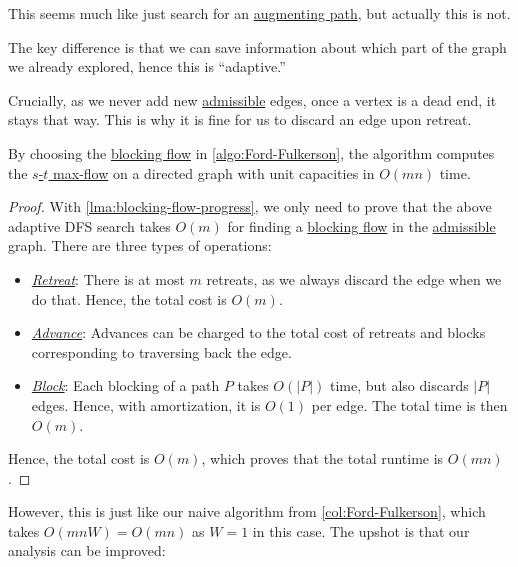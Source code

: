 This seems much like just search for an \hyperref[def:augmenting-path]{augmenting path}, but actually this is not.

\begin{intuition}
	The key difference is that we can save information about which part of the graph we already explored, hence this is ``adaptive.''
\end{intuition}

Crucially, as we never add new \hyperref[def:admissible]{admissible} edges, once a vertex is a dead end, it stays that way. This is why it is fine for us to discard an edge upon retreat.

\begin{theorem}\label{thmj:Ford-Fulkerson-blocking-flow-unit}
	By choosing the \hyperref[def:blocking-flow]{blocking flow} in \autoref{algo:Ford-Fulkerson}, the algorithm computes the \hyperref[prb:s-t-max-flow]{\(s\)-\(t\) max-flow} on a directed graph with unit capacities in \(O(mn)\) time.
\end{theorem}
\begin{proof}
	With \autoref{lma:blocking-flow-progress}, we only need to prove that the above adaptive DFS search takes \(O(m)\) for finding a \hyperref[def:blocking-flow]{blocking flow} in the \hyperref[def:admissible]{admissible} graph. There are three types of operations:
	\begin{itemize}
		\item \hyperref[algo:adaptive-DFS-retreat]{\emph{Retreat}}: There is at most \(m\) retreats, as we always discard the edge when we do that. Hence, the total cost is \(O(m)\).
		\item \hyperref[algo:adaptive-DFS-advance]{\emph{Advance}}: Advances can be charged to the total cost of retreats and blocks corresponding to traversing back the edge.
		\item \hyperref[algo:adaptive-DFS-block]{\emph{Block}}: Each blocking of a path \(P\) takes \(O(\lvert P \rvert )\) time, but also discards \(\lvert P \rvert \) edges. Hence, with amortization, it is \(O(1)\) per edge. The total time is then \(O(m)\).
	\end{itemize}
	Hence, the total cost is \(O(m)\), which proves that the total runtime is \(O(mn)\).
\end{proof}

However, this is just like our naive algorithm from \autoref{col:Ford-Fulkerson}, which takes \(O(mnW) = O(mn)\) as \(W = 1\) in this case. The upshot is that our analysis can be improved:

